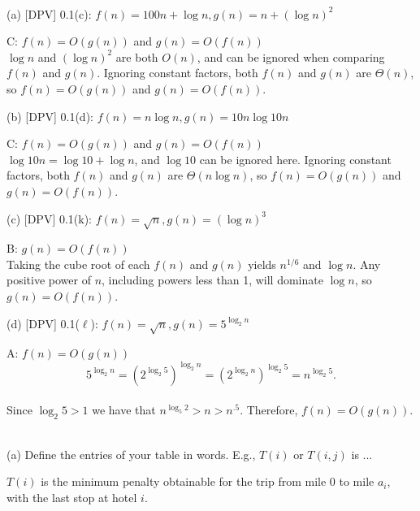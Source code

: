 \documentclass[12pt]{amsart}
\theoremstyle{plain}
\theoremstyle{definition}
\theoremstyle{remark}
\begin{document}
	\thispagestyle{fancy}
	\pagestyle{plain}
	
	  \\
	(a)  [DPV] 0.1(c): $f(n) = 100n + \log n, g(n) = n + (\log n)^2$
	
	\begin{tcolorbox}
		C: $f(n) = O(g(n))$ and $g(n) = O(f(n))$\\
		$\log n$ and $(\log n)^2$ are both $O(n)$, and can be ignored when comparing $f(n)$ and $g(n)$.  Ignoring constant factors, both $f(n)$ and $g(n)$ are $\Theta(n)$, so $f(n) = O(g(n))$ and $g(n) = O(f(n))$.
	\end{tcolorbox}
	
	(b)  [DPV] 0.1(d): $f(n) = n \log n, g(n) = 10n \log 10n$
	
	\begin{tcolorbox}
		C: $f(n) = O(g(n))$ and $g(n) = O(f(n))$\\
		$\log 10n = \log 10 + \log n$, and $\log 10$ can be ignored here.  Ignoring constant factors, both $f(n)$ and $g(n)$ are $\Theta(n\log n)$, so $f(n) = O(g(n))$ and $g(n) = O(f(n))$.
	\end{tcolorbox}
	
	(c)  [DPV] 0.1(k): $f(n) = \sqrt{n}, g(n) = (\log n)^3$
	
	\begin{tcolorbox}
		B: $g(n) = O(f(n))$\\
		Taking the cube root of each $f(n)$ and $g(n)$ yields $n^{1/6}$ and $\log n$.  Any positive power of $n$, including powers less than 1, will dominate $\log n$, so $g(n) = O(f(n))$.
	\end{tcolorbox}

	(d) [DPV] 0.1($\ell$): $f(n) = \sqrt{n}, g(n) = 5^{\log_2 n}$
	
	\begin{tcolorbox}
		A: $f(n) = O(g(n))$\\
		\[  5^{\log_2 n} = \left(2^{\log_2{5}}\right)^{\log_2 n} = \left(2^{\log_2{n}}\right)^{\log_2{5}} = n^{\log_2{5}}.\]
		\\
		Since $\log_2{5} > 1$ we have that $n^{\log_5{2}} > n >  n^{.5}$. Therefore, $f(n) = O(g(n))$.
	\end{tcolorbox}

	\newpage
	  \\
	(a) Define the entries of your table in words.  E.g., $T(i)$ or $T(i,j)$ is ...
	
	\begin{tcolorbox}
		$T(i)$ is the minimum penalty obtainable for the trip from mile 0 to mile $a_i$, with the last stop at hotel $i$.
	\end{tcolorbox}
\end{document}
